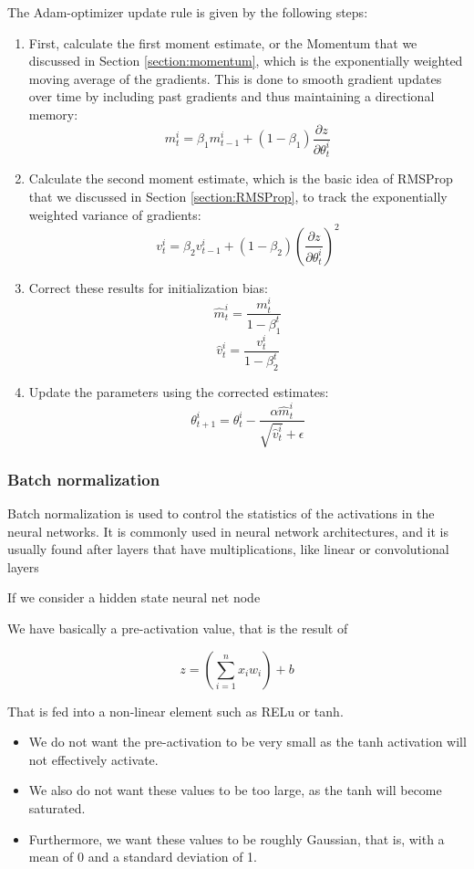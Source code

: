 		
		The Adam-optimizer update rule is given by the following steps:
		\bigskip
		\begin{enumerate}[label=\Roman*.]
			\item First, calculate the first moment estimate, or the Momentum that we discussed in Section \ref{section:momentum}, which is the exponentially weighted moving average of the gradients. This is done to smooth gradient updates over time by including past gradients and thus maintaining a directional memory:
			$$
			m^i_t = \beta_1 m^i_{t-1} + (1 - \beta_1)\frac{\partial z}{\partial \theta^i_{t}}
			$$
			
			\item Calculate the second moment estimate, which is the basic idea of RMSProp that we discussed in Section \ref{section:RMSProp}, to track the exponentially weighted variance of gradients:
			$$
			v^i_t = \beta_2 v^i_{t-1} + (1 - \beta_2) \left( \frac{\partial z}{\partial \theta^i_{t}} \right)^2
			$$
			
			\item Correct these results for initialization bias:
			$$
			\hat{m}^i_t = \frac{m^i_t}{1 - \beta_1^t}
			$$
			$$
			\hat{v}^i_t = \frac{v^i_t}{1 - \beta_2^t}
			$$
			
			\item Update the parameters using the corrected estimates:
			$$
			\theta^i_{t+1} = \theta^i_t - \frac{\alpha \hat{m}^i_t}{\sqrt{\hat{v}^i_t} + \epsilon}
			$$
		\end{enumerate}


		\bigskip
		\subsubsection{Batch normalization}
		
		Batch normalization is used to control the statistics of the activations in the neural networks. It is commonly used in neural network architectures, and it is usually found after layers that have multiplications, like linear or convolutional layers 
		
		If we consider a hidden state neural net node
		
		We have basically a pre-activation value, that is the result of 
		
		$$
		z = \left(\sum_{i=1}^{n} x_i w_i \right)+ b
		$$
		
		That is fed into a non-linear element such as RELu or tanh.
		
		\begin{itemize}
			\item We do not want the pre-activation to be very small as the tanh activation will not effectively activate.
			\item We also do not want these values to be too large, as the tanh will become saturated.
			\item Furthermore, we want these values to be roughly Gaussian, that is, with a mean of 0 and a standard deviation of 1.
		\end{itemize}
		\bigskip
		
